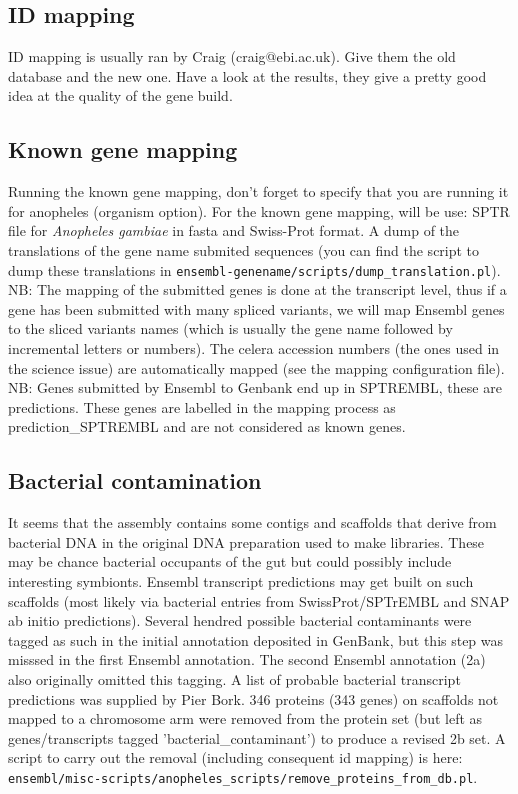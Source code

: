 \documentclass[a4paper,10pt]{article}
\begin{document}
\subsection{ID mapping}
ID mapping is usually ran by Craig (craig@ebi.ac.uk). Give them the old database and the new one. Have a look at the results, they give a pretty good idea at the quality of the gene build.

\subsection{Known gene mapping}
Running the known gene mapping, don't forget to specify that you are running it for anopheles (organism option). For the known gene mapping, will be use: SPTR file for \textit{Anopheles gambiae} in fasta and Swiss-Prot format. A dump of the translations of the gene name submited sequences (you can find the script to dump these translations in \texttt{ensembl-genename/scripts/dump\_translation.pl}). NB: The mapping of the submitted genes is done at the transcript level, thus if a gene has been submitted with many spliced variants, we will map Ensembl genes to the sliced variants names (which is usually the gene name followed by incremental letters or numbers).
The celera accession numbers (the ones used in the science issue) are automatically mapped (see the mapping configuration file). 
NB: Genes submitted by Ensembl to Genbank end up in SPTREMBL, these are predictions. These genes are labelled in the mapping process as prediction\_SPTREMBL and are not considered as known genes.

\subsection{Bacterial contamination}
It seems that the assembly contains some contigs and scaffolds that derive from bacterial DNA in the original DNA preparation used to make libraries.  These may be chance bacterial occupants of the gut but could possibly include interesting symbionts. Ensembl transcript predictions may get built on such scaffolds (most likely via bacterial entries from SwissProt/SPTrEMBL and SNAP ab initio predictions). Several hendred possible bacterial contaminants were tagged as such in the initial annotation deposited in GenBank, but this step was misssed in the first Ensembl annotation.  The second Ensembl annotation (2a) also originally omitted this tagging.  A list of probable bacterial transcript predictions was supplied by Pier Bork.  346 proteins (343 genes) on scaffolds not mapped to a chromosome arm were removed from the protein set (but left as genes/transcripts tagged 'bacterial\_contaminant') to produce a revised 2b set. A script to carry out the removal (including consequent id mapping) is here:
 \texttt{ensembl/misc-scripts/anopheles\_scripts/remove\_proteins\_from\_db.pl}.
\end{document}
